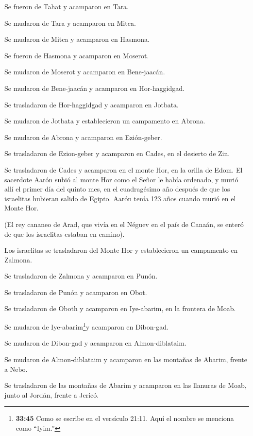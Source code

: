  Se fueron de Tahat y acamparon en Tara.

 Se mudaron de Tara y acamparon en Mitca.

 Se mudaron de Mitca y acamparon en Hasmona.

 Se fueron de Hasmona y acamparon en Moserot.

 Se mudaron de Moserot y acamparon en Bene-jaacán.

 Se mudaron de Bene-jaacán y acamparon en Hor-haggidgad.

 Se trasladaron de Hor-haggidgad y acamparon en Jotbata.

 Se mudaron de Jotbata y establecieron un campamento en
Abrona.

 Se mudaron de Abrona y acamparon en Ezión-geber.

 Se trasladaron de Ezion-geber y acamparon en Cades, en el
desierto de Zin.

 Se trasladaron de Cades y acamparon en el monte Hor, en la
orilla de Edom.  El sacerdote Aarón subió al monte Hor como
el Señor le había ordenado, y murió allí el primer día del quinto mes,
en el cuadragésimo año después de que los israelitas hubieran salido de
Egipto.  Aarón tenía 123 años cuando murió en el Monte Hor.

 (El rey cananeo de Arad, que vivía en el Néguev en el país
de Canaán, se enteró de que los israelitas estaban en camino).

 Los israelitas se trasladaron del Monte Hor y
establecieron un campamento en Zalmona.

 Se trasladaron de Zalmona y acamparon en Punón.

 Se trasladaron de Punón y acamparon en Obot.

 Se trasladaron de Oboth y acamparon en Iye-abarim, en la
frontera de Moab.

 Se mudaron de Iye-abarim\footnote{\textbf{33:45} Como se
  escribe en el versículo 21:11. Aquí el nombre se menciona como
  ``Iyim.''}y acamparon en Dibon-gad.

 Se mudaron de Dibon-gad y acamparon en Almon-diblataim.

 Se mudaron de Almon-diblataim y acamparon en las montañas
de Abarim, frente a Nebo.

 Se trasladaron de las montañas de Abarim y acamparon en
las llanuras de Moab, junto al Jordán, frente a Jericó.

